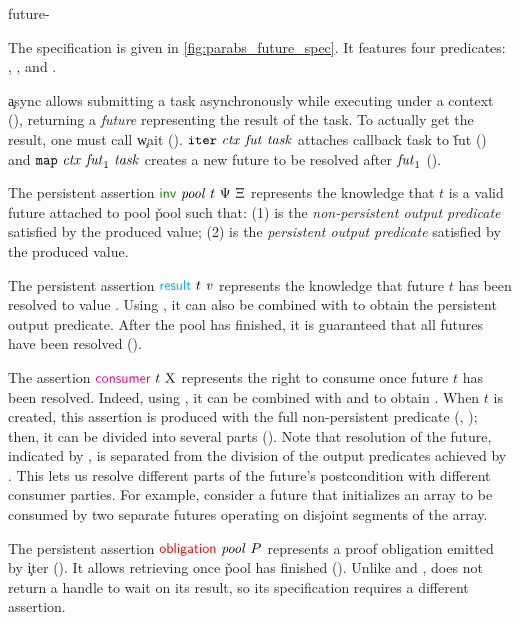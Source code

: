 \begin{tirPrefix}{future-}



The specification is given in \cref{fig:parabs_future_spec}.
It features four predicates: \inv, \result, \consumer and \obligation.

\c{async} allows submitting a task asynchronously while executing under a context (), returning a \emph{future} representing the result of the task.
To actually get the result, one must call \c{wait} ().
$\c{iter}\ \v{ctx}\ \v{fut}\ \v{task}$ attaches callback \v{task} to \v{fut} () and $\c{map}\ \v{ctx}\ \v{fut}_1\ \v{task}$ creates a new future to be resolved after $\v{fut}_1$ ().

The persistent assertion $\inv\ \v{pool}\ t\ \iPredTwo\ \iPredFour$ represents the knowledge that $t$ is a valid future attached to pool \v{pool} such that:
(1) \iPredTwo is the \emph{non-persistent output predicate} satisfied by the produced value;
(2) \iPredFour is the \emph{persistent output predicate} satisfied by the produced value.

The persistent assertion $\result\ t\ \zooVal$ represents the knowledge that future $t$ has been resolved to value \zooVal.
Using , it can also be combined with \inv to obtain the persistent output predicate.
After the pool has finished, it is guaranteed that all futures have been resolved ().

The assertion $\consumer\ t\ \iPredThree$ represents the right to consume \iPredThree once future $t$ has been resolved.
Indeed, using , it can be combined with \inv and \result to obtain \iPredThree.
When $t$ is created, this assertion is produced with the full non-persistent predicate (, ); then, it can be divided into several parts ().
Note that resolution of the future, indicated by \result, is separated from the division of the output predicates achieved by \consumer.
This lets us resolve different parts of the future's postcondition with different consumer parties.
For example, consider a future that initializes an array to be consumed by two separate futures operating on disjoint segments of the array.

The persistent assertion $\obligation\ \v{pool}\ \iProp$ represents a proof obligation emitted by \c{iter} ().
It allows retrieving \iProp once \v{pool} has finished ().
Unlike  and ,  does not return a handle to wait on its result, so its specification requires a different assertion.

\end{tirPrefix}

